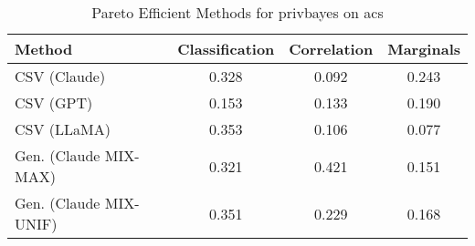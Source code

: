 \begin{table}[t!]
    \centering
    \caption{Pareto Efficient Methods for privbayes on acs}
    \label{tab:pareto_efficient_methods_privbayes_acs}
    \begin{tabular}{lccc}
    \toprule
    Method & Classification & Correlation & Marginals \\
    \midrule
    CSV (Claude) & \cellcolor{bronze!30}0.328 & \cellcolor{gold!30}0.092 & 0.243 \\
    CSV (GPT) & \cellcolor{gold!30}0.153 & \cellcolor{bronze!30}0.133 & 0.190 \\
    CSV (LLaMA) & 0.353 & \cellcolor{silver!30}0.106 & \cellcolor{gold!30}0.077 \\
    Gen. (Claude MIX-MAX) & \cellcolor{silver!30}0.321 & 0.421 & \cellcolor{silver!30}0.151 \\
    Gen. (Claude MIX-UNIF) & 0.351 & 0.229 & \cellcolor{bronze!30}0.168 \\
    \bottomrule
    \end{tabular}
\end{table}